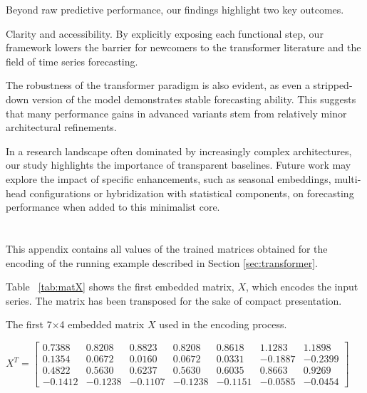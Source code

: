 \documentclass[algorithms,article,submit,pdftex,moreauthors]{Definitions/mdpi}
\begin{document}
Beyond raw predictive performance, our findings highlight two key outcomes.

Clarity and accessibility. By explicitly exposing each functional step, our framework lowers the barrier for newcomers to the transformer literature and the field of time series forecasting.

The robustness of the transformer paradigm is also evident, as even a stripped-down version of the model demonstrates stable forecasting ability. This suggests that many performance gains in advanced variants stem from relatively minor architectural refinements.

In a research landscape often dominated by increasingly complex architectures, our study highlights the importance of transparent baselines. Future work may explore the impact of specific enhancements, such as seasonal embeddings, multi-head configurations or hybridization with statistical components, on forecasting performance when added to this minimalist core.

\appendixstart
\appendix
\section[\appendixname~\thesection]{} \label{sec:appendix}
This appendix contains all values of the trained matrices obtained for the encoding of the running example described in Section \ref{sec:transformer}.

\noindent Table ~\ref{tab:matX} shows the first embedded matrix, $X$, which encodes the input series. The matrix has been transposed for the sake of compact presentation.

\begin{table}[ht]
	\centering
	\caption{The first 7$\times$4 embedded matrix $X$ used in the encoding process.}
	\label{tab:matX}
	$
	X^T =	\begin{bmatrix}
			0.7388 & 0.8208 & 0.8823 & 0.8208 & 0.8618 & 1.1283 & 1.1898 \\
			0.1354 & 0.0672 & 0.0160 & 0.0672 & 0.0331 & -0.1887 & -0.2399 \\
			0.4822 & 0.5630 & 0.6237 & 0.5630 & 0.6035 & 0.8663 & 0.9269 \\
			-0.1412 & -0.1238 & -0.1107 & -0.1238 & -0.1151 & -0.0585 & -0.0454
		\end{bmatrix}
	$
\end{table}
\end{document}
